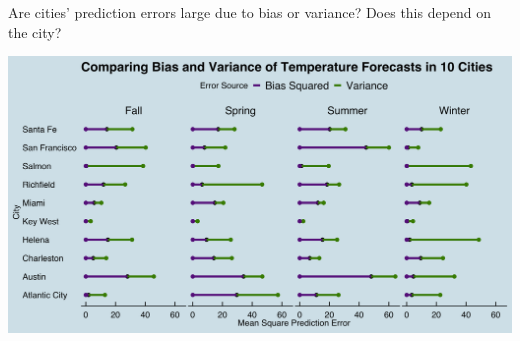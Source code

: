 \documentclass[handout,t]{beamer}
\begin{document}
\section{}
\begin{frame}{Are cities' prediction errors large due to bias or variance? Does this depend on the city?
}
  \begin{center}
  \includegraphics[scale=0.06]{BiasVarGraph.png}
  \end{center}
\end{frame}
\end{document}
